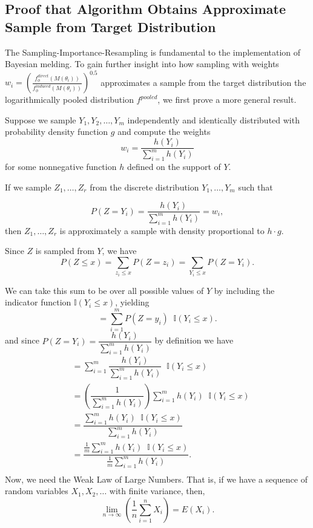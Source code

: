 \documentclass[12pt,twoside]{smiththesis}
\begin{document}
\newpage

\hypertarget{proof}{%
\subsection{Proof that Algorithm Obtains Approximate Sample from Target Distribution}\label{proof}}

The Sampling-Importance-Resampling is fundamental to the implementation of Bayesian melding. To gain further insight into how sampling with weights
\(w_i = \left( \frac{f_\phi^{direct}(M(\theta_i))}{f_\phi^{induced}(M(\theta_i))} \right)^{0.5}\)
approximates a sample from the target distribution the logarithmically pooled distribution \(f^{pooled}\), we first prove a more general result.
\begin{tcolorbox}
Suppose we sample $Y_1, Y_2, \dots, Y_m$ independently and identically distributed with probability density function  $g$ and compute the weights
\[ w_i =\dfrac{h(Y_i)}{\sum_{i=1}^mh(Y_i) }\]
for some nonnegative function $h$ defined on the support of $Y$.

If  we sample $Z_1, \dots, Z_r$ from the discrete distribution $Y_1,\dots, Y_m$ such that 

\[ P(Z = Y_i) = \dfrac{h(Y_i)}{\sum_{i=1}^mh(Y_i) } = w_i ,\]
then $Z_1, \dots, Z_r$ is approximately a sample with density proportional to $h \cdot g$.

\end{tcolorbox}
\vspace{5 mm}

Since \(Z\) is sampled from \(Y\), we have
\[ P(Z \leq x ) = \sum_{z_i \leq x} P(Z=z_i) = \sum_{Y_i \leq x} P(Z=Y_i) .\]

We can take this sum to be over all possible values of \(Y\) by including the indicator function \(\mathbb{I} (Y_i \leq x)\), yielding
\[  = \sum_{i = 1}^m P(Z=y_i)\;\;\mathbb{I} (Y_i \leq x).  \]
and since \(P(Z=Y_i) = \dfrac{h(Y_i)}{\sum_{i=1}^mh(Y_i) }\) by definition we have
\begin{align*} 
&= \sum_{i = 1}^m \dfrac{h(Y_i)}{\sum_{i=1}^mh(Y_i) }  \;\;\mathbb{I} (Y_i \leq x)   \\
&=  \left( \dfrac{1}{ {\sum_{i=1}^mh(Y_i) }} \right) {\sum_{i=1}^mh(Y_i) }  \;\;\mathbb{I} (Y_i \leq x)   \\
&=   \dfrac{ {\sum_{i=1}^mh(Y_i) }  \;\;\mathbb{I} (Y_i \leq x) }{\sum_{i=1}^mh(Y_i) } \\
&=   \dfrac{ \frac 1m {\sum_{i=1}^mh(Y_i) }  \;\;\mathbb{I} (Y_i \leq x) }{\frac 1m \sum_{i=1}^mh(Y_i) }. \\
\end{align*}
Now, we need the Weak Law of Large Numbers. That is, if we have a sequence of random variables \(X_1, X_2, \dots\) with finite variance, then,
\[ \lim_{n \to \infty} \left( \frac{1}{n} \sum_{i=1}^n X_i \right)  = E(X_i). \]
\end{document}
